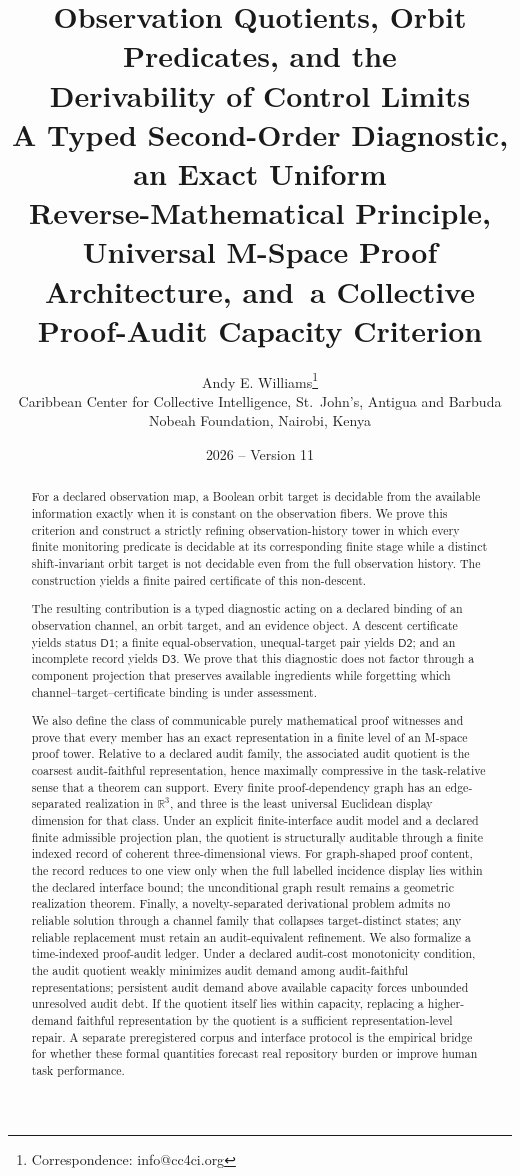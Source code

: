 \documentclass[11pt]{article}
\title{Observation Quotients, Orbit Predicates, and the\\
Derivability of Control Limits\\[3pt]
\large A Typed Second-Order Diagnostic, an Exact Uniform\\
Reverse-Mathematical Principle, Universal M-Space Proof Architecture, and\
\large a Collective Proof-Audit Capacity Criterion}
\author{Andy E. Williams\thanks{Correspondence: info@cc4ci.org}\\[3pt]
\small Caribbean Center for Collective Intelligence, St.~John's, Antigua and Barbuda\\
\small Nobeah Foundation, Nairobi, Kenya}
\date{2026 -- Version 11}
\newcommand{\DOne}{\ensuremath{\mathsf{D1}}}
\newcommand{\DTwo}{\ensuremath{\mathsf{D2}}}
\newcommand{\DThree}{\ensuremath{\mathsf{D3}}}
\theoremstyle{plain}
\theoremstyle{definition}
\theoremstyle{remark}
\begin{document}
\maketitle

\begin{abstract}
For a declared observation map, a Boolean orbit target is decidable from the
available information exactly when it is constant on the observation fibers.  We
prove this criterion and construct a strictly refining observation-history tower
in which every finite monitoring predicate is decidable at its corresponding
finite stage while a distinct shift-invariant orbit target is not decidable even
from the full observation history.  The construction yields a finite paired
certificate of this non-descent.

The resulting contribution is a typed diagnostic acting on a declared binding of
an observation channel, an orbit target, and an evidence object.  A descent
certificate yields status $\DOne$; a finite equal-observation, unequal-target
pair yields $\DTwo$; and an incomplete record yields $\DThree$.  We prove that
this diagnostic does not factor through a component projection that preserves
available ingredients while forgetting which channel--target--certificate
binding is under assessment.

We also define the class of communicable purely mathematical proof witnesses and
prove that every member has an exact representation in a finite level of an
M-space proof tower.  Relative to a declared audit family, the associated audit
quotient is the coarsest audit-faithful representation, hence maximally
compressive in the task-relative sense that a theorem can support.  Every finite
proof-dependency graph has an edge-separated realization in $\mathbb R^3$, and
three is the least universal Euclidean display dimension for that class.  Under
an explicit finite-interface audit model and a declared finite admissible
projection plan, the quotient is structurally auditable through a finite indexed
record of coherent three-dimensional views.  For graph-shaped proof content,
the record reduces to one view only when the full labelled incidence display lies
within the declared interface bound; the unconditional graph result remains a
geometric realization theorem.  Finally, a novelty-separated derivational
problem admits no reliable solution through a channel family that collapses
target-distinct states; any reliable replacement must retain an
audit-equivalent refinement.  We also formalize a time-indexed proof-audit
ledger.  Under a declared audit-cost monotonicity condition, the audit quotient
weakly minimizes audit demand among audit-faithful representations; persistent
audit demand above available capacity forces unbounded unresolved audit debt.
If the quotient itself lies within capacity, replacing a higher-demand faithful
representation by the quotient is a sufficient representation-level repair.
A separate preregistered corpus and interface protocol is the empirical bridge
for whether these formal quantities forecast real repository burden or improve
human task performance.


\end{abstract}
\end{document}
